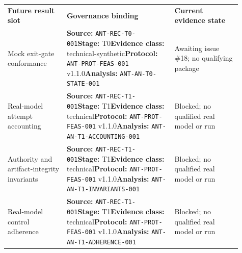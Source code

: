 \small
\begin{tabular}{@{}>{\raggedright\arraybackslash}p{0.23\linewidth}>{\raggedright\arraybackslash}p{0.42\linewidth}>{\raggedright\arraybackslash}p{0.26\linewidth}@{}}
\toprule
\multicolumn{3}{@{}l}{\textbf{GOVERNED EMPTY STATE --- ANT-TBL-004}} \\
\midrule
\textbf{Future result slot} & \textbf{Governance binding} & \textbf{Current evidence state} \\
\midrule
Mock exit-gate conformance & {\scriptsize\textbf{Source:} \nolinkurl{ANT-REC-T0-001}\newline \textbf{Stage:} T0\newline\textbf{Evidence class:} technical-synthetic\newline\textbf{Protocol:} \nolinkurl{ANT-PROT-FEAS-001} v1.1.0\newline\textbf{Analysis:} \nolinkurl{ANT-AN-T0-STATE-001}} & Awaiting issue \#18; no qualifying package \\
\addlinespace[0.25em]
Real-model attempt accounting & {\scriptsize\textbf{Source:} \nolinkurl{ANT-REC-T1-001}\newline \textbf{Stage:} T1\newline\textbf{Evidence class:} technical\newline\textbf{Protocol:} \nolinkurl{ANT-PROT-FEAS-001} v1.1.0\newline\textbf{Analysis:} \nolinkurl{ANT-AN-T1-ACCOUNTING-001}} & Blocked; no qualified real model or run \\
\addlinespace[0.25em]
Authority and artifact-integrity invariants & {\scriptsize\textbf{Source:} \nolinkurl{ANT-REC-T1-001}\newline \textbf{Stage:} T1\newline\textbf{Evidence class:} technical\newline\textbf{Protocol:} \nolinkurl{ANT-PROT-FEAS-001} v1.1.0\newline\textbf{Analysis:} \nolinkurl{ANT-AN-T1-INVARIANTS-001}} & Blocked; no qualified real model or run \\
\addlinespace[0.25em]
Real-model control adherence & {\scriptsize\textbf{Source:} \nolinkurl{ANT-REC-T1-001}\newline \textbf{Stage:} T1\newline\textbf{Evidence class:} technical\newline\textbf{Protocol:} \nolinkurl{ANT-PROT-FEAS-001} v1.1.0\newline\textbf{Analysis:} \nolinkurl{ANT-AN-T1-ADHERENCE-001}} & Blocked; no qualified real model or run \\

\end{tabular}
